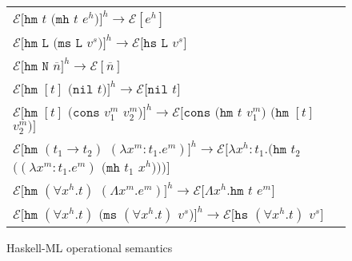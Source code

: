 \begin{figure}[p]
\centering
\begin{tabular}{l}


$\mathscr{E}[\mathtt{hm}$ $t$ $(\mathtt{mh}$ $t$ $e^h)]^h\rightarrow\mathscr{E}[e^h]$ \\


$\mathscr{E}[\mathtt{hm}$ $\mathtt{L}$ $(\mathtt{ms}$ $\mathtt{L}$ $v^s)]^h\rightarrow\mathscr{E}[\mathtt{hs}$ $\mathtt{L}$ $v^s]$ \\


$\mathscr{E}[\mathtt{hm}$ $\mathtt{N}$ $\overline{n}]^h\rightarrow\mathscr{E}[\overline{n}]$ \\


$\mathscr{E}[\mathtt{hm}$ $[t]$ $(\mathtt{nil}$ $t)]^h\rightarrow\mathscr{E}[\mathtt{nil}$ $t]$ \\


$\mathscr{E}[\mathtt{hm}$ $[t]$ $(\mathtt{cons}$ $v^m_1$ $v^m_2)]^h\rightarrow\mathscr{E}[\mathtt{cons}$ $(\mathtt{hm}$ $t$ $v^m_1)$ $(\mathtt{hm}$ $[t]$ $v^m_2)]$ \\


$\mathscr{E}[\mathtt{hm}$ $(t_1\rightarrow t_2)$ $(\lambda x^m:t_1.e^m)]^h\rightarrow\mathscr{E}[\lambda x^h:t_1.(\mathtt{hm}$ $t_2$ $((\lambda x^m:t_1.e^m)$ $(\mathtt{mh}$ $t_1$ $x^h)))]$ \\


$\mathscr{E}[\mathtt{hm}$ $(\forall x^h.t)$ $(\Lambda x^m.e^m)]^h\rightarrow\mathscr{E}[\Lambda x^h.\mathtt{hm}$ $t$ $e^m]$ \\


$\mathscr{E}[\mathtt{hm}$ $(\forall x^h.t)$ $(\mathtt{ms}$ $(\forall x^h.t)$ $v^s)]^h\rightarrow\mathscr{E}[\mathtt{hs}$ $(\forall x^h.t)$ $v^s]$ \\

\end{tabular}
\caption{Haskell-ML operational semantics}
\label{hmos}
\end{figure}